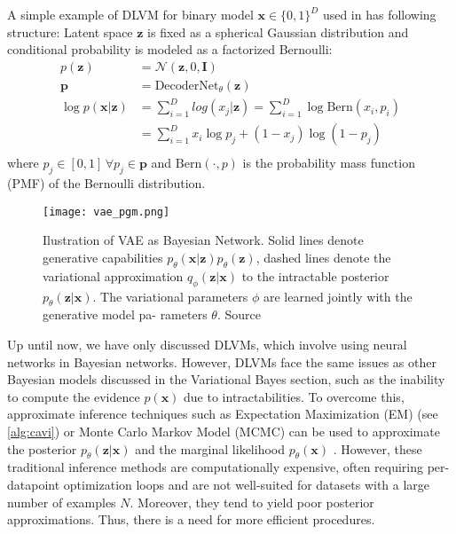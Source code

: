 \begin{example}
    A simple example of DLVM for binary model $\mathbf{x} \in \{0,1\}^{D}$ used in \cite{vae-ssl-dgm-2014} has following structure:
    Latent space $\mathbf{z}$ is fixed as a spherical Gaussian distribution and conditional probability is modeled as
    a factorized Bernoulli:
    \begin{align*}
        p(\mathbf{z}) &= \mathcal{N}(\mathbf{z},0,\mathbf{I})\\
        \mathbf{p} &= \mathrm{DecoderNet}_\theta(\mathbf{z}) \\
        \log p(\mathbf{x}|\mathbf{z}) &= \sum_{i=1}^D log(x_j | \mathbf{z}) = \sum_{i=1}^D \log \mathrm{Bern}(x_i,p_i)\\
        &= \sum_{i=1}^D x_i \log p_j + (1-x_j) \log(1-p_j)\\
    \end{align*}
    where $p_j \in [0,1]\,\forall p_j \in \mathbf{p}$ and $\mathrm{Bern}(\cdot,p)$ is the probability mass function (PMF)
    of the Bernoulli distribution.
\end{example}

\begin{figure}[tb]
    \centering
    \texttt{[image: vae\_pgm.png]}
    \caption[VAE as Bayesian network]{Ilustration of VAE as Bayesian Network. Solid lines denote generative capabilities 
    $p_\theta(\mathbf{x}|\mathbf{z})p_\theta(\mathbf{z})$, dashed lines denote the variational approximation $q_\phi(\mathbf{z}|\mathbf{x})$
    to the intractable posterior $p_\theta(\mathbf{z}|\mathbf{x})$. The variational parameters $\phi$ are learned jointly with the generative model pa-
    rameters $\theta$. Source \cite{vae-original-2013}}
    \label{fig:vae_pgm}
\end{figure}

Up until now, we have only discussed DLVMs, which involve using neural networks in Bayesian networks. However, DLVMs face the same issues as 
other Bayesian models discussed in the Variational Bayes section, such as the inability to compute the evidence $p(\mathbf{x})$ due to 
intractabilities. To overcome this, approximate inference techniques such as Expectation Maximization (EM) (see \ref{alg:cavi}) or 
Monte Carlo Markov Model (MCMC)  can be used to approximate the posterior $p_\theta(\mathbf{z}|\mathbf{x})$ and the marginal 
likelihood $p_\theta(\mathbf{x})$ \cite[appx.~A2]{intro-vae-2019}.  However, these traditional inference methods are computationally expensive,
often requiring per-datapoint optimization loops and are not well-suited for datasets with a large number of examples $N$. Moreover, they tend
to yield poor posterior approximations. Thus, there is a need for more efficient procedures.
